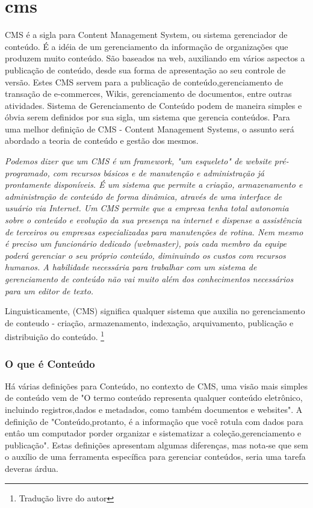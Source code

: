 \chapter{cms}

CMS é a sigla para Content Management System, ou sistema gerenciador de conteúdo. É a idéia de um gerenciamento da informação de organizações que produzem muito conteúdo. São baseados na web, auxiliando em vários aspectos a publicação de conteúdo, desde sua forma de apresentação ao seu controle de versão. Estes CMS servem para a publicação de conteúdo,gerenciamento de transação de e-commerces, Wikis, gerenciamento de documentos, entre outras atividades. Sistema de Gerenciamento de Conteúdo podem de maneira simples e óbvia serem definidos por sua sigla, um sistema que gerencia conteúdos. Para uma melhor definição de CMS - Content Management Systems, o assunto será abordado a teoria de conteúdo e gestão dos mesmos.

\emph{Podemos dizer que um CMS é um framework, "um esqueleto" de website pré-programado, com recursos básicos e de manutenção e administração já prontamente disponíveis. É um sistema que permite a criação, armazenamento e administração de conteúdo de forma dinâmica, através de uma interface de usuário via Internet. Um CMS permite que a empresa tenha total autonomia sobre o conteúdo e evolução da sua presença na internet e dispense a assistência de terceiros ou empresas especializadas para manutenções de rotina. Nem mesmo é preciso um funcionário dedicado (webmaster), pois cada membro da equipe poderá gerenciar o seu próprio conteúdo, diminuindo os custos com recursos humanos. A habilidade necessária para trabalhar com um sistema de gerenciamento de conteúdo não vai muito além dos conhecimentos necessários para um editor de texto.} 
\cite{navita}

Linguisticamente, (CMS) significa qualquer sistema que auxilia no gerenciamento de conteudo - criação, armazenamento, indexação, arquivamento, publicação e distribuição do conteúdo.
\cite{what_is_cms}\footnote{Tradução livre do autor}

\subsection{O que é Conteúdo}

Há várias definições para Conteúdo, no contexto de CMS, uma visão mais simples de conteúdo vem de \cite{ecm_paper} "O termo conteúdo representa qualquer conteúdo eletrônico, incluindo registros,dados e metadados, como também documentos e websites". 
A definição de \cite{cms_bible} "Conteúdo,protanto, é a informação que você rotula com dados para entâo um computador porder organizar e sistematizar a coleção,gerenciamento e publicação". Estas definições apresentam algumas diferenças, mas nota-se que sem o auxílio de uma ferramenta específica para gerenciar conteúdos, seria uma tarefa deveras árdua.

